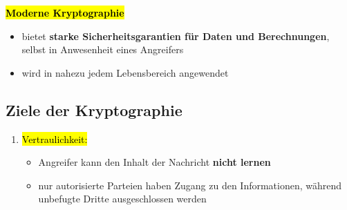 \documentclass[a4paper, 10pt]{article}
\begin{document}
\noindent\textbf{\hl{Moderne Kryptographie}}
\begin{itemize}
    \item  bietet \textbf{starke Sicherheitsgarantien für Daten und Berechnungen}, selbst in Anwesenheit eines Angreifers
    \item wird in nahezu jedem Lebensbereich angewendet
\end{itemize}

\subsection{Ziele der Kryptographie}
\begin{enumerate}
    \item \hl{Vertraulichkeit:}
    \begin{itemize}
        \item Angreifer kann den Inhalt der Nachricht \textbf{nicht lernen}
        \item nur autorisierte Parteien haben Zugang zu den Informationen, während unbefugte Dritte ausgeschlossen werden 
    \end{itemize}
\end{enumerate}
\end{document}
